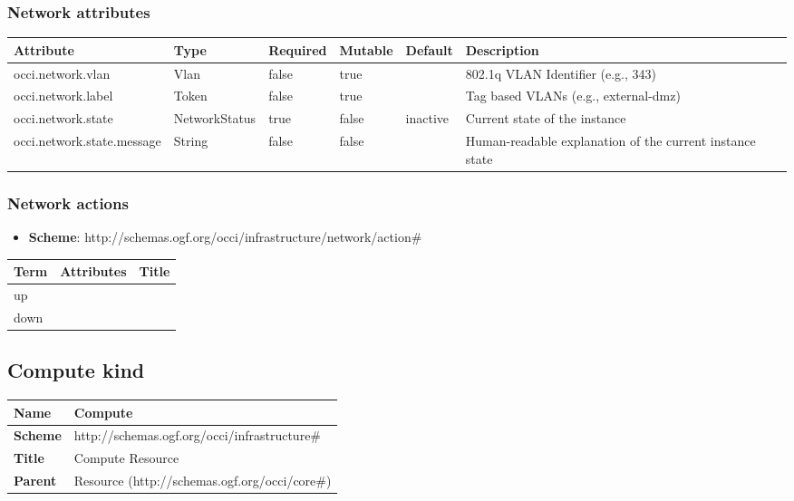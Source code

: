 \documentclass{article}
\begin{document}
\subsubsection{Network attributes}
\begin{tabularx}{\textwidth}{|l|l|p{1.4cm}|p{1.3cm}|l|X|}
  \hline
  \textbf{Attribute} & \textbf{Type} & \textbf{Required} & \textbf{Mutable} & \textbf{Default} & \textbf{Description} \\
  \hline  
  occi.network.vlan & Vlan & false & true &  & 802.1q VLAN Identifier (e.g., 343) \\
  \hline
  occi.network.label & Token & false & true &  & Tag based VLANs (e.g., external-dmz) \\
  \hline
  occi.network.state & NetworkStatus & true & false & inactive & Current state of the instance \\
  \hline
  occi.network.state.message & String & false & false &  & Human-readable explanation of the current instance state \\
  \hline
\end{tabularx}

\subsubsection{Network actions}
\begin{itemize}
	\item \textbf{Scheme}: http://schemas.ogf.org/occi/infrastructure/network/action\#
\end{itemize}
\begin{tabularx}{\textwidth}{|l|l|X|}
  \hline
  \textbf{Term}  & \textbf{Attributes} & \textbf{Title} \\
  \hline  
  up & &  \\
  \hline
  down & &  \\
  \hline
\end{tabularx}

\subsection{Compute kind}
\begin{center}
\begin{tabular}{|l|l|}
  \hline
  \textbf{Name} & Compute \\
  \hline  
  \textbf{Scheme} & http://schemas.ogf.org/occi/infrastructure\# \\
  \hline
  \textbf{Title} & Compute Resource \\
  \hline
  \textbf{Parent} & Resource (http://schemas.ogf.org/occi/core\#) \\
  \hline
\end{tabular}
\end{center}
\end{document}
